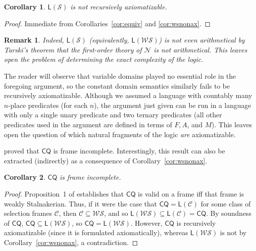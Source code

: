 \documentclass[12pt]{article}
\newtheorem{corollary}{Corollary}
\newtheorem{remark}{Remark}
\begin{document}
\begin{corollary}\label{cor:snonax}
    $\mathsf{L}(\mathcal{S})$ is not recursively axiomatizable. 
\end{corollary}
\begin{proof}
    Immediate from Corollaries~\ref{cor:equiv} and \ref{cor:wsnonax}.
\end{proof}

\begin{remark}
    Indeed, $\mathsf{L}(\mathcal{S})$ (equivalently, $\mathsf{L}(\mathcal{WS})$) is not even \emph{arithmetical} by Tarski's theorem that the first-order theory of $\mathcal{N}$ is not arithmetical. This leaves open the problem of determining the exact complexity of the logic.
\end{remark}

The reader will observe that variable domains played no essential role in the foregoing argument, so the constant domain semantics similarly fails to be recursively axiomatizable. Although we assumed a language with countably many $n$-place predicates (for each $n$), the argument just given can be run in a language with only a single unary predicate and two ternary predicates (all other predicates used in the argument are defined in terms of $F, A$, and $M$). This leaves open the question of which natural fragments of the logic \emph{are} axiomatizable.

\cite{KocurekWalshWeissA} proved that $\mathsf{CQ}$ is frame incomplete. Interestingly, this result can also be extracted (indirectly) as a consequence of Corollary~\ref{cor:wsnonax}.


\begin{corollary}\label{cor:frameincomplete}
    $\mathsf{CQ}$ is frame incomplete.
\end{corollary}
\begin{proof}
    Proposition~1 of \cite{KocurekWalshWeissA} establishes that $\mathsf{CQ}$ is valid on a frame iff that frame is weakly Stalnakerian. 
    Thus, if it were the case that $\mathsf{CQ}=\mathsf{L}(\mathcal{C})$ for some class of selection frames $\mathcal{C}$, then $\mathcal{C}\subseteq\mathcal{WS}$, and so $\mathsf{L}(\mathcal{WS})\subseteq\mathsf{L}(\mathcal{C})=\mathsf{CQ}$. 
    By soundness of $\mathsf{CQ}$, $\mathsf{CQ}\subseteq\mathsf{L}(\mathcal{WS})$, so $\mathsf{CQ}=\mathsf{L}(\mathcal{WS})$. 
    However, $\mathsf{CQ}$ is recursively axiomatizable (since it is formulated axiomatically), whereas $\mathsf{L}(\mathcal{WS})$ is not by Corollary~\ref{cor:wsnonax}, a contradiction.
\end{proof}
\end{document}
